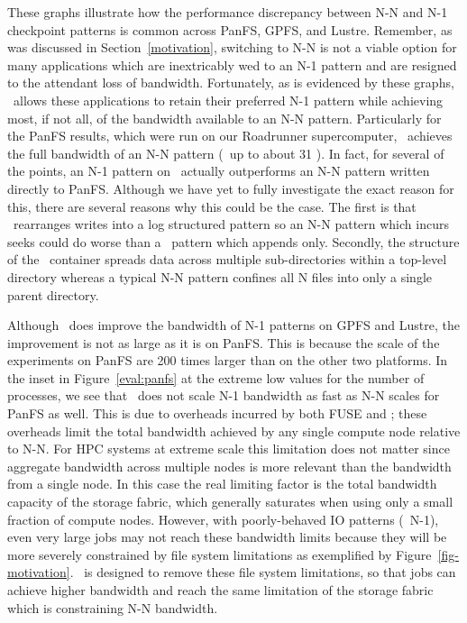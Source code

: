 These graphs illustrate how the performance discrepancy between N-N
and N-1 checkpoint patterns is common across PanFS, GPFS,
and Lustre. Remember, as was discussed in Section~\ref{motivation}, switching
to N-N is not a viable option for many applications which are inextricably wed
to an N-1 pattern and are resigned to the attendant loss of bandwidth.
Fortunately, as is evidenced by these graphs, \plfs\ allows these applications
to retain their preferred N-1 pattern while achieving most, if not all, of the
bandwidth available to an N-N pattern. Particularly for the PanFS results,
which were run on our Roadrunner supercomputer, \plfs\ achieves the full
bandwidth of an N-N pattern (\ie\ up to about 31 \GBs). In fact, for several
of the points, an N-1 pattern on \plfs\ actually outperforms an N-N pattern
written directly to PanFS. Although we have yet to fully investigate the exact
reason for this, there are several reasons why this could be the case. The
first is that \plfs\ rearranges writes into a log structured pattern so an N-N
pattern which incurs seeks could do worse than a \plfs\ pattern which appends
only. Secondly, the structure of the \plfs\ container spreads data across
multiple sub-directories within a top-level directory whereas a typical N-N
pattern confines all N files into only a single parent directory.

Although \plfs\ does improve the bandwidth of N-1 patterns on GPFS and Lustre,
the improvement is not as large as it is on PanFS. This is because the scale
of the experiments on PanFS are 200 times larger than on the other two
platforms. In the inset in Figure~\ref{eval:panfs} at the extreme low values
for the number of processes, we see that \plfs\ does not scale N-1 bandwidth
as fast as N-N scales for PanFS as well. This is due to overheads incurred by
both FUSE and \plfs; these overheads limit the total bandwidth achieved by any
single compute node relative to N-N. For HPC systems at extreme scale this
limitation does not matter since aggregate bandwidth across multiple nodes is
more relevant than the bandwidth from a single node. In this case the real
limiting factor is the total bandwidth capacity of the storage fabric, which
generally saturates when using only a small fraction of compute nodes.
However, with poorly-behaved IO patterns (\ie\ N-1), even very large jobs may
not reach these bandwidth limits because they will be more severely
constrained by file system limitations as exemplified by
Figure~\ref{fig-motivation}. \plfs\ is designed to remove these file system
limitations, so that jobs can achieve higher bandwidth and reach the
same limitation of the storage fabric which is constraining N-N bandwidth. 
 
